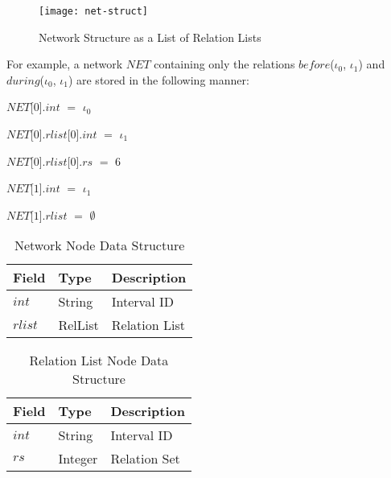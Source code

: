 \documentclass[11pt]{report}
\newenvironment{vquote}
{
  \begin{list}{}{\leftmargin 1em}\item[]
}
{
  \end{list}
}
\begin{document}
          \begin{figure}[tbhp]
            \begin{center}
              \texttt{[image: net-struct]}
              \caption{Network Structure as a List of Relation Lists}
              \label{figu-impln-nwstr}
            \end{center}
          \end{figure}

          For example, a network $NET$ containing only the relations
          $before$($\iota_0$, $\iota_1$) and $during$($\iota_0$, $\iota_1$) are
          stored in the following manner:

          \begin{vquote}
            $NET$[$0$].$int$ $=$ $\iota_0$

            $NET$[$0$].$rlist$[$0$].$int$ $=$ $\iota_1$

            $NET$[$0$].$rlist$[$0$].$rs$ $=$ $6$

            $NET$[$1$].$int$ $=$ $\iota_1$

            $NET$[$1$].$rlist$ $=$ $\emptyset$
          \end{vquote}

          \begin{table}[tbhp]
            \begin{center}
              \begin{tabular}[t]{|l|l|l|}
                \hline
                {\bf Field} & {\bf Type} & {\bf Description} \\
                \hline
                $int$ & String & Interval ID \\
                \hline
                $rlist$   & RelList & Relation List \\
                \hline
              \end{tabular}
            \end{center}
            \caption{Network Node Data Structure}
            \label{tabl-impln-nwdsr}
          \end{table}

          \begin{table}[tbhp]
            \begin{center}
              \begin{tabular}[t]{|l|l|l|}
                \hline
                {\bf Field} & {\bf Type} & {\bf Description} \\
                \hline
                $int$ & String & Interval ID \\
                \hline
                $rs$      & Integer & Relation Set \\
                \hline
              \end{tabular}
            \end{center}
            \caption{Relation List Node Data Structure}
            \label{tabl-impln-rldsr}
          \end{table}
\end{document}
